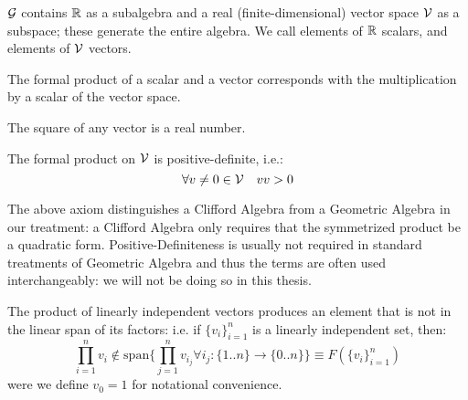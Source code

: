 \begin{axiom}\label{a:ga-axiom1}
    $\mathcal{G}$ contains $\mathbb{R}$ as a subalgebra and a real (finite-dimensional) vector space $\mathcal{V}$ as a subspace; these generate the entire algebra. We call elements of $\mathbb{R}$ scalars, and elements of $\mathcal{V}$ vectors.
\end{axiom}

\begin{axiom}\label{a:ga-axiom2}
	The formal product of a scalar and a vector corresponds with the multiplication by a scalar of the vector space.
\end{axiom}

\begin{axiom}\label{a:ga-axiom3}
    The square of any vector is a real number.
\end{axiom}

\begin{axiom}\label{a:ga-axiom4}
	The formal product on $\mathcal{V}$ is positive-definite, i.e.:
\[\forall v \neq 0 \in \mathcal{V} \quad vv > 0\]
\end{axiom}
\begin{remark}\label{r:ga-axiom4}
	The above axiom distinguishes a Clifford Algebra from a Geometric Algebra in our treatment: a Clifford Algebra only requires that the symmetrized product be a quadratic form. Positive-Definiteness is usually not required in standard treatments of Geometric Algebra and thus the terms are often used interchangeably: we will not be doing so in this thesis.
\end{remark}

\begin{axiom}\label{a:ga-axiom5}
	The product of linearly independent vectors produces an element that is not in the linear span of its factors: i.e. if $\{v_i\}_{i=1}^n$ is a linearly independent set, then:
	\[\prod_{i=1}^n v_i \notin \mathrm{span}\{\prod_{j=1}^n v_{i_j} \forall i_j : \{1..n\} \to \{0..n\} \} \equiv F(\{v_i\}_{i=1}^n)\]
	were we define $v_0 = 1$ for notational convenience.
\end{axiom}
